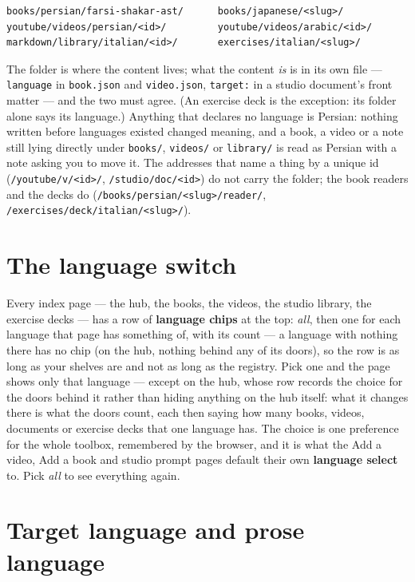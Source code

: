 \documentclass[11pt,oneside]{report}
\newcommand{\file}[1]{\texttt{#1}}
\newcommand{\menu}[1]{\textsf{#1}}
\begin{document}
\begin{lstlisting}
books/persian/farsi-shakar-ast/      books/japanese/<slug>/
youtube/videos/persian/<id>/         youtube/videos/arabic/<id>/
markdown/library/italian/<id>/       exercises/italian/<slug>/
\end{lstlisting}

The folder is where the content lives; what the content \emph{is} is in its
own file --- \texttt{language} in \file{book.json} and \file{video.json},
\texttt{target:} in a studio document's front matter --- and the two must
agree. (An exercise deck is the exception: its folder alone says its
language.) Anything that declares no language is Persian: nothing written before
languages existed changed meaning, and a book, a video or a note still lying
directly under \file{books/}, \file{videos/} or \file{library/} is read as
Persian with a note asking you to move it. The addresses that name a thing by
a unique id (\texttt{/youtube/v/<id>/}, \texttt{/studio/doc/<id>}) do not
carry the folder; the book readers and the decks do
(\texttt{/books/persian/<slug>/reader/},
\texttt{/exercises/deck/italian/<slug>/}).

\section{The language switch}

Every index page --- the hub, the books, the videos, the studio library, the
exercise decks ---
has a row of \textbf{language chips} at the top: \emph{all}, then one for
each language that page has something of, with its count --- a language
with nothing there has no chip (on the hub, nothing behind any of its doors),
so the row is as long as your shelves are and not as long as the registry. Pick one and the page shows only
that language ---
except on the hub, whose row records the choice for the doors behind it
rather than hiding anything on the hub itself: what it changes there is what
the doors count, each then saying how many books, videos, documents or
exercise decks that one language has. The choice is one preference
for the whole toolbox, remembered by the browser,
and it is what the \menu{Add a video}, \menu{Add a book} and studio prompt
pages default their own \textbf{language select} to. Pick \emph{all} to see
everything again.

\section{Target language and prose language}
\end{document}
